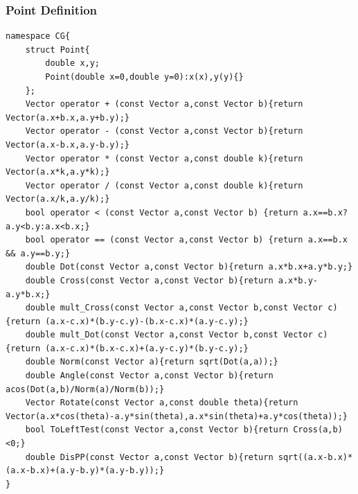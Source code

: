 \documentclass[10pt]{ctexart}
\begin{document}
{\subsubsection{Point Definition}
\begin{lstlisting}
namespace CG{
    struct Point{
        double x,y;
        Point(double x=0,double y=0):x(x),y(y){}
    };
    Vector operator + (const Vector a,const Vector b){return Vector(a.x+b.x,a.y+b.y);}
    Vector operator - (const Vector a,const Vector b){return Vector(a.x-b.x,a.y-b.y);}
    Vector operator * (const Vector a,const double k){return Vector(a.x*k,a.y*k);}
    Vector operator / (const Vector a,const double k){return Vector(a.x/k,a.y/k);}
    bool operator < (const Vector a,const Vector b) {return a.x==b.x?a.y<b.y:a.x<b.x;}
    bool operator == (const Vector a,const Vector b) {return a.x==b.x && a.y==b.y;}
    double Dot(const Vector a,const Vector b){return a.x*b.x+a.y*b.y;}
    double Cross(const Vector a,const Vector b){return a.x*b.y-a.y*b.x;}
    double mult_Cross(const Vector a,const Vector b,const Vector c){return (a.x-c.x)*(b.y-c.y)-(b.x-c.x)*(a.y-c.y);}
    double mult_Dot(const Vector a,const Vector b,const Vector c){return (a.x-c.x)*(b.x-c.x)+(a.y-c.y)*(b.y-c.y);} 
    double Norm(const Vector a){return sqrt(Dot(a,a));}
    double Angle(const Vector a,const Vector b){return acos(Dot(a,b)/Norm(a)/Norm(b));}
    Vector Rotate(const Vector a,const double theta){return Vector(a.x*cos(theta)-a.y*sin(theta),a.x*sin(theta)+a.y*cos(theta));}
    bool ToLeftTest(const Vector a,const Vector b){return Cross(a,b)<0;}
    double DisPP(const Vector a,const Vector b){return sqrt((a.x-b.x)*(a.x-b.x)+(a.y-b.y)*(a.y-b.y));}
}
\end{lstlisting}
}
\end{document}
